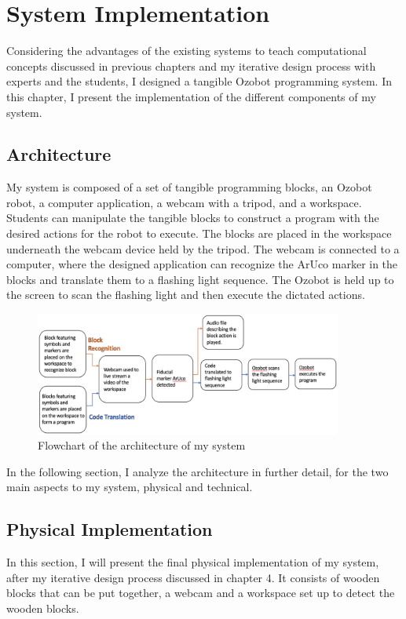 \documentclass[oneside,%
                    author={Malak Hajji},
                    degree={BSc},
                    title={Designing An Accessible Computational Toolkit For Students},
                  subtitle={With Mixed Visual Abilities}]{dissertation}
\begin{document}




\chapter{System Implementation}
Considering the advantages of the existing systems to teach computational concepts discussed in previous chapters and my iterative design process with experts and the students, I designed a tangible Ozobot programming system. In this chapter, I present the implementation of the different components of my system.

\section{Architecture}
My system is composed of a set of tangible programming blocks, an Ozobot robot, a computer application, a webcam with a tripod, and a workspace. Students can manipulate the tangible blocks to construct a program with the desired actions for the robot to execute. The blocks are placed in the workspace underneath the webcam device held by the tripod. The webcam is connected to a computer, where the designed application can recognize the ArUco marker in the blocks and translate them to a flashing light sequence. The Ozobot is held up to the screen to scan the flashing light and then execute the dictated actions.
\FloatBarrier
\begin{figure}[h]
    \centering
    \includegraphics[width=0.9\textwidth]{flowchart.eps}
    \caption{Flowchart of the architecture of my system}
    \label{fig-flowchart}
\end{figure}
\FloatBarrier
In the following section, I analyze the architecture in further detail, for the two main aspects to my system, physical and technical.
\section{Physical Implementation}
In this section, I will present the final physical implementation of my system, after my iterative design process discussed in chapter 4. It consists of wooden blocks that can be put together, a webcam and a workspace set up to detect the wooden blocks.
\end{document}
